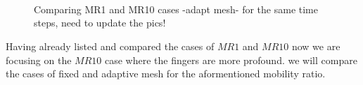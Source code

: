 \documentclass[preprint,authoryear,12pt]{elsarticle}
\begin{document}
\begin{figure}[ht!]
\begin{center}
{}\\ 
\\
\\
\end{center}
\caption{Comparing MR1 and MR10 cases -adapt mesh- for the same time steps, need to update the pics!}
\label{fig:}
\end{figure}

Having already listed and compared the cases of $MR1$ and $MR10$ now we are focusing on the $MR10$ case where the fingers are more profound. we will compare the cases of fixed and adaptive mesh for the aformentioned mobility ratio.
\end{document}
